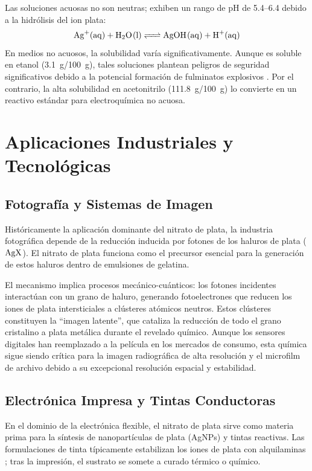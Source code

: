 \documentclass[pdflatex,sn-mathphys-num]{sn-jnl}
\theoremstyle{thmstyleone}%
\theoremstyle{thmstyletwo}%
\theoremstyle{thmstylethree}%
\begin{document}
Las soluciones acuosas no son neutras; exhiben un rango de pH de
\numrange{5.4}{6.4} debido a la hidrólisis del ion plata:
\begin{equation}
  \ce{Ag+(aq) + H2O(l) <=> AgOH(aq) + H+(aq)}
\end{equation}
En medios no acuosos, la solubilidad varía significativamente. Aunque es soluble
en etanol (\qty{3.1}{\gram}/\qty{100}{\gram}), tales soluciones plantean
peligros de seguridad significativos debido a la potencial formación de
fulminatos explosivos \cite{CameoChemicals}. Por el contrario, la alta solubilidad en acetonitrilo
(\qty{111.8}{\gram}/\qty{100}{\gram}) lo convierte en un reactivo estándar para
electroquímica no acuosa.

\section{Aplicaciones Industriales y Tecnológicas}
\label{sec:applications}

\subsection{Fotografía y Sistemas de Imagen}
Históricamente la aplicación dominante del nitrato de plata, la industria
fotográfica depende de la reducción inducida por fotones de los haluros de
plata ($\ce{AgX}$). El nitrato de plata funciona como el precursor esencial para
la generación de estos haluros dentro de emulsiones de gelatina.

El mecanismo implica procesos mecánico-cuánticos: los fotones incidentes
interactúan con un grano de haluro, generando fotoelectrones que reducen los
iones de plata intersticiales a clústeres atómicos neutros. Estos clústeres
constituyen la ``imagen latente'', que cataliza la reducción de todo el grano
cristalino a plata metálica durante el revelado químico. Aunque los sensores
digitales han reemplazado a la película en los mercados de consumo, esta
química sigue siendo crítica para la imagen radiográfica de alta resolución y el
microfilm de archivo debido a su excepcional resolución espacial y estabilidad.

\subsection{Electrónica Impresa y Tintas Conductoras}
En el dominio de la electrónica flexible, el nitrato de plata sirve como materia
prima para la síntesis de nanopartículas de plata (AgNPs) y tintas reactivas.
Las formulaciones de tinta típicamente estabilizan los iones de plata con
alquilaminas \cite{Yang2017}; tras la impresión, el sustrato se somete a curado
térmico o químico.
\end{document}
